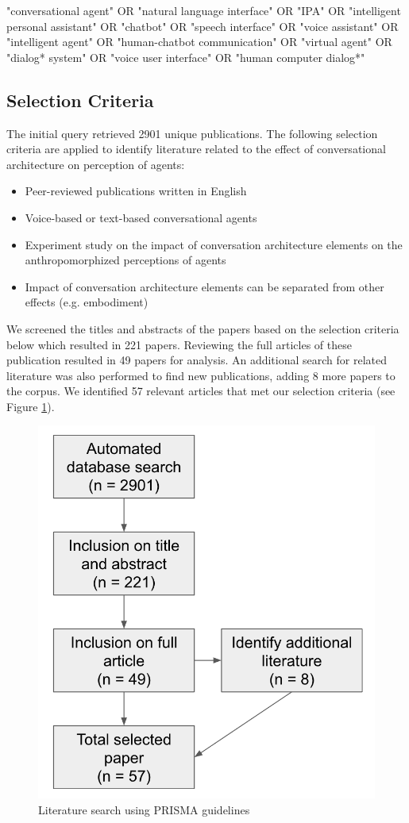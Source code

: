 \documentclass[sigconf,screen,review, anonymous]{acmart}
\begin{document}
\begin{mdframed}
"conversational agent" OR "natural language interface" OR "IPA" OR "intelligent personal assistant" OR "chatbot" OR "speech interface" OR "voice assistant" OR "intelligent agent" OR "human-chatbot communication" OR "virtual agent" OR "dialog* system" OR "voice user interface" OR "human computer dialog*"
\end{mdframed}

\subsection{Selection Criteria}
The initial query retrieved 2901 unique publications. The following selection criteria are applied to identify literature related to the effect of conversational architecture on perception of agents:
\begin{itemize}
  \item Peer-reviewed publications written in English
  \item Voice-based or text-based conversational agents
  \item Experiment study on the impact of conversation architecture elements on the anthropomorphized perceptions of agents
  \item Impact of conversation architecture elements can be separated from other effects (e.g. embodiment)

\end{itemize}

We screened the titles and abstracts of the papers based on the selection criteria below which resulted in 221 papers. Reviewing the full articles of these publication resulted in 49 papers for analysis. An additional search for related literature was also performed to find new publications, adding 8 more papers to the corpus. We identified 57 relevant articles that met our selection criteria (see Figure \ref{fig:prisma}).

\begin{figure}[h]
  \centering
  \includegraphics[width=0.6\columnwidth]{fig-prisma.png}
  \caption{Literature search using PRISMA guidelines}
  \label{fig:prisma}
\end{figure}
\end{document}
